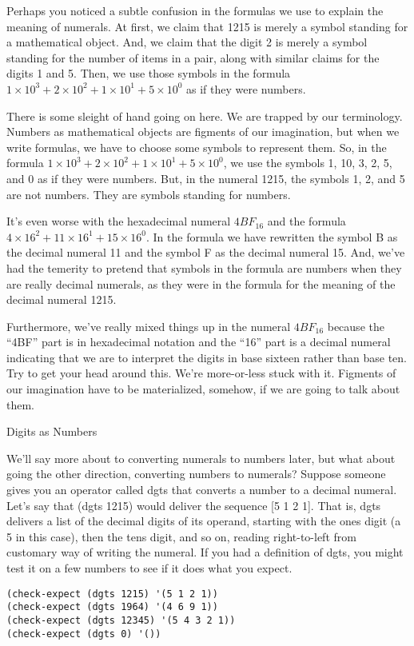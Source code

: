 \begin{aside}
Perhaps you noticed a subtle confusion in the formulas we use
to explain the meaning of numerals. At first, we claim that
1215 is merely a symbol standing for a mathematical object.
And, we claim that the digit 2 is merely a symbol standing
for the number of items in a pair, along with similar
claims for the digits 1 and 5. Then, we use those symbols
in the formula $1 \times 10^3 + 2 \times 10^2 + 1 \times 10^1 + 5 \times 10^0$
as if they were numbers.

There is some sleight of hand going on here.
We are trapped by our terminology.
Numbers as mathematical objects are figments of our imagination,
but when we write formulas, we have to choose some symbols to
represent them.
So, in the formula $1 \times 10^3 + 2 \times 10^2 + 1 \times 10^1 + 5 \times 10^0$,
we use the symbols 1, 10, 3, 2, 5, and 0 as if they were numbers.
But, in the numeral 1215, the symbols 1, 2, and 5 are not numbers.
They are symbols standing for numbers.

It's even worse with the hexadecimal numeral $4BF_{16}$
and the formula $4 \times 16^2 + 11 \times 16^1 + 15 \times 16^0$.
In the formula we have rewritten the symbol B as the decimal numeral 11
and the symbol F as the decimal numeral 15.
And, we've had the temerity to pretend that symbols
in the formula are numbers when they are really decimal numerals,
as they were in the formula for the meaning of the decimal numeral 1215.

Furthermore, we've really mixed things up in the numeral
$4BF_{16}$ because the ``4BF'' part is in hexadecimal notation
and the ``16'' part is a decimal numeral indicating that we are
to interpret the digits in base sixteen rather than base ten.
Try to get your head around this.
We're more-or-less stuck with it. Figments of our imagination have
to be materialized, somehow, if we are going to talk about them.
\caption{Digits as Numbers}
\label{aside-digits-as-numbers}
\end{aside}

We'll say more about to converting numerals to numbers later,
but what about going the other direction, converting
numbers to numerals?
Suppose someone gives you an operator called dgts that
converts a number to a decimal numeral.
Let's say that (dgts 1215) would deliver the sequence [5 1 2 1].
That is, dgts delivers a list of the decimal digits
of its operand,
starting with the ones digit (a 5 in this case),
then the tens digit, and so on, reading right-to-left from
customary way of writing the numeral.
If you had a definition of dgts, 
you might test it on a few numbers to see if it does what you expect.
\begin{Verbatim}
(check-expect (dgts 1215) '(5 1 2 1))
(check-expect (dgts 1964) '(4 6 9 1))
(check-expect (dgts 12345) '(5 4 3 2 1))
(check-expect (dgts 0) '())
\end{Verbatim}

